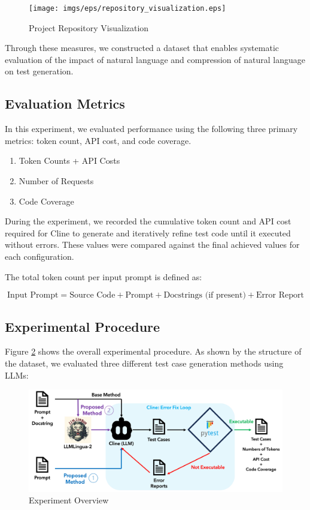\begin{figure}[htbp]
    \centering
    \texttt{[image: imgs/eps/repository\_visualization.eps]}
    \caption{Project Repository Visualization}
    \label{fig:repository_visualization}
\end{figure}

Through these measures, we constructed a dataset that enables systematic evaluation of the impact of natural language and compression of natural language on test generation.

\subsection{Evaluation Metrics}

In this experiment, we evaluated performance using the following three primary metrics: token count, API cost, and code coverage.

\begin{enumerate}
    \item Token Counts + API Costs
\vspace{0.2cm}
    \item Number of Requests
\vspace{0.2cm}
    \item Code Coverage
\end{enumerate}

During the experiment, we recorded the cumulative token count and API cost required for Cline to generate and iteratively refine test code until it executed without errors. These values were compared against the final achieved values for each configuration.

The total token count per input prompt is defined as:

\[
\text{Input Prompt}
  = \text{Source Code}
  + \text{Prompt}
  + \text{Docstrings (if present)}
  + \text{Error Report}
\]

\subsection{Experimental Procedure}
Figure \ref{fig:experiment_overview} shows the overall experimental procedure. As shown by the structure of the dataset, we evaluated three different test case generation methods using LLMs:

\begin{figure}[htbp]
    \centering
    \includegraphics[width=1.0\linewidth]{imgs/png/overview_old.png}
    \caption{Experiment Overview}
    \label{fig:experiment_overview}
\end{figure}

